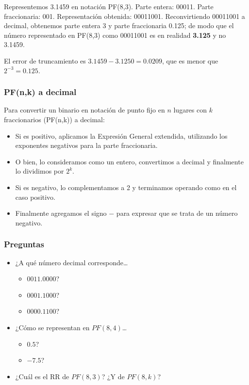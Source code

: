 \documentclass[spanish,A4,]{article}
\begin{document}
Representemos 3.1459 en notación PF(8,3). Parte entera: 00011. Parte
fraccionaria: 001. Representación obtenida: 00011001. Reconvirtiendo
00011001 a decimal, obtenemos parte entera 3 y parte fraccionaria 0.125;
de modo que el número representado en PF(8,3) como 00011001 es en
realidad \textbf{3.125} y no 3.1459.

El error de truncamiento es $3.1459 - 3.1250 = 0.0209$, que es menor que
$2^{-3} = 0.125$.

\subsubsection{PF(n,k) a decimal}\label{pfnk-a-decimal}

Para convertir un binario en notación de punto fijo en $n$ lugares con
$k$ fraccionarios (PF(n,k)) a decimal:

\begin{itemize}
\itemsep1pt\parskip0pt
\item
  Si es positivo, aplicamos la Expresión General extendida, utilizando
  los exponentes negativos para la parte fraccionaria.
\item
  O bien, lo consideramos como un entero, convertimos a decimal y
  finalmente lo dividimos por $2^k$.
\item
  Si es negativo, lo complementamos a 2 y terminamos operando como en el
  caso positivo.
\item
  Finalmente agregamos el signo $-$ para expresar que se trata de un
  número negativo.
\end{itemize}

\subsubsection{Preguntas}\label{preguntas}

\begin{itemize}
\itemsep1pt\parskip0pt
\item
  ¿A qué número decimal corresponde\ldots{}

  \begin{itemize}
  \itemsep1pt\parskip0pt
  \item
    $0011.0000$?
  \item
    $0001.1000$?
  \item
    $0000.1100$?
  \end{itemize}
\item
  ¿Cómo se representan en $PF(8,4)$\ldots{}

  \begin{itemize}
  \itemsep1pt\parskip0pt
  \item
    $0.5$?
  \item
    $-7.5$?
  \end{itemize}
\item
  ¿Cuál es el RR de $PF(8,3)$? ¿Y de $PF(8,k)$?
\end{itemize}
\end{document}
